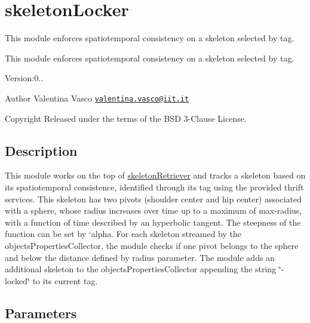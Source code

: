 \section{skeleton\+Locker}
\label{group__skeletonLocker}


This module enforces spatiotemporal consistency on a skeleton selected by tag.  


This module enforces spatiotemporal consistency on a skeleton selected by tag. 

Version\+:0.. \begin{DoxyAuthor}{Author}
Valentina Vasco \href{mailto:valentina.vasco@iit.it}{\tt valentina.\+vasco@iit.\+it} ~\newline
 
\end{DoxyAuthor}
\begin{DoxyCopyright}{Copyright}
Released under the terms of the B\+SD 3-\/\+Clause License. 
\end{DoxyCopyright}
\hypertarget{group__skeletonViewer_intro_sec}{}\subsection{Description}\label{group__skeletonViewer_intro_sec}
This module works on the top of \hyperlink{group__skeletonRetriever}{skeleton\+Retriever} and tracks a skeleton based on its spatiotemporal consistence, identified through its tag using the provided thrift services. This skeleton has two pivots (shoulder center and hip center) associated with a sphere, whose radius increases over time up to a maximum of {\ttfamily max-\/radius}, with a function of time described by an hyperbolic tangent. The steepness of the function can be set by `alpha. For each skeleton streamed by the objects\+Properties\+Collector, the module checks if one pivot belongs to the sphere and below the distance defined by {\ttfamily radius} parameter. The module adds an additional skeleton to the objects\+Properties\+Collector appending the string \char`\"{}-\/locked\char`\"{} to its current tag.\hypertarget{group__skeletonViewer_parameters_sec}{}\subsection{Parameters}\label{group__skeletonViewer_parameters_sec}

